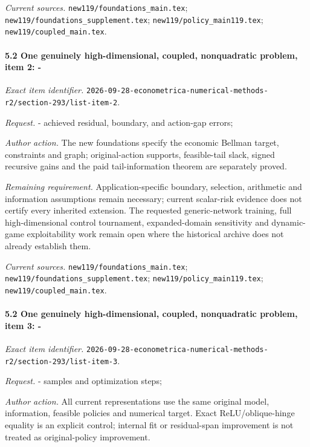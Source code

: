 \par\emph{Current sources.} \nolinkurl{new119/foundations_main.tex}; \nolinkurl{new119/foundations_supplement.tex}; \nolinkurl{new119/policy_main119.tex}; \nolinkurl{new119/coupled_main.tex}.

\paragraph{5.2 One genuinely high-dimensional, coupled, nonquadratic problem, item 2: -}

\emph{Exact item identifier.} \nolinkurl{2026-09-28-econometrica-numerical-methods-r2/section-293/list-item-2}.

\par\emph{Request.} - achieved residual, boundary, and action-gap errors;

\par\emph{Author action.} The new foundations specify the economic Bellman target, constraints and graph; original-action supports, feasible-tail slack, signed recursive gains and the paid tail-information theorem are separately proved.

\par\emph{Remaining requirement.} Application-specific boundary, selection, arithmetic and information assumptions remain necessary; current scalar-risk evidence does not certify every inherited extension. The requested generic-network training, full high-dimensional control tournament, expanded-domain sensitivity and dynamic-game exploitability work remain open where the historical archive does not already establish them.

\par\emph{Current sources.} \nolinkurl{new119/foundations_main.tex}; \nolinkurl{new119/foundations_supplement.tex}; \nolinkurl{new119/policy_main119.tex}; \nolinkurl{new119/coupled_main.tex}.

\paragraph{5.2 One genuinely high-dimensional, coupled, nonquadratic problem, item 3: -}

\emph{Exact item identifier.} \nolinkurl{2026-09-28-econometrica-numerical-methods-r2/section-293/list-item-3}.

\par\emph{Request.} - samples and optimization steps;

\par\emph{Author action.} All current representations use the same original model, information, feasible policies and numerical target. Exact ReLU/\allowbreak{}oblique-hinge equality is an explicit control; internal fit or residual-span improvement is not treated as original-policy improvement.

